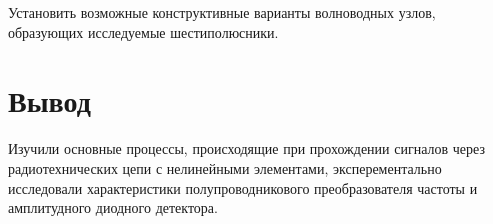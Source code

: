 \documentclass[a4paper,12pt]{article}
\begin{document}
Установить возможные конструктивные варианты волноводных узлов, образующих исследуемые шестиполюсники.

\section{Вывод}
Изучили основные процессы, происходящие при прохождении сигналов через радиотехнических цепи с нелинейными элементами, эксперементально исследовали характеристики полупроводникового преобразователя частоты и амплитудного диодного детектора. 




\end{document}
